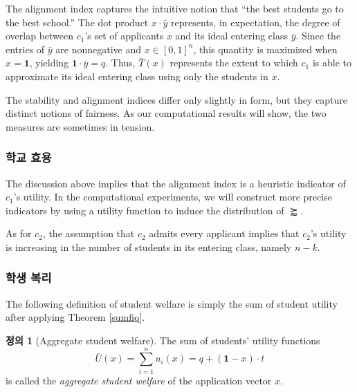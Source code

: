 \documentclass[12pt]{article} %
\newif\ifEN
\theoremstyle{definition}
\newtheorem{definition}{Definition}
\theoremstyle{definition}
\newtheorem{definition}{정의}
\begin{document}
The alignment index captures the intuitive notion that “the best students go to the best school.” The dot product $x \cdot \bar y$ represents, in expectation, the degree of overlap between $c_1$’s set of applicants $x$ and its ideal entering class $\bar y$. Since the entries of $\bar y$ are nonnegative and $x \in [0, 1]^n$, this quantity is maximized when $x = \mathbf{1}$, yielding $\mathbf{1} \cdot \bar y  = q$. Thus, $\bar T(x)$ represents the extent to which $c_1$ is able to approximate its ideal entering class using only the students in $x$.

The stability and alignment indices differ only slightly in form, but they capture distinct notions of fairness. As our computational results will show, the two measures are sometimes in tension.

\ifEN \subsubsection{School utility} \else \subsubsection{학교 효용} \fi
The discussion above implies that the alignment index is a heuristic indicator of $c_1$’s utility. In the computational experiments, we will construct more precise indicators by using a utility function to induce the distribution of $\succapprox$.

As for $c_2$, the assumption that $c_2$ admits every applicant implies that $c_2$’s utility is increasing in the number of students in its entering class, namely $n - k$. 

\ifEN \subsubsection{Student welfare} \else \subsubsection{학생 복리} \fi
The following definition of student welfare is simply the sum of student utility after applying Theorem \ref{sumfiq}.  
\begin{definition}[Aggregate student welfare]
The sum of students’ utility functions
\begin{equation}
\bar U(x) = \sum_{i=1}^n u_i(x)=  q + ( \mathbf{1} - x) \cdot t
\label{defux}
\end{equation} 
is called the \emph{aggregate student welfare} of the application vector $x$. 
\end{definition}
\end{document}
